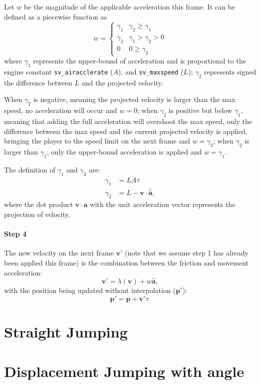 \documentclass[a4paper,12pt]{article}
\newcommand{\tvec}[1]{\boldsymbol{#1}}
\newcommand{\tunit}[1]{\boldsymbol{\hat{#1}}}
\newcommand{\ta}{\tvec{a}}
\newcommand{\tv}{\tvec{v}}
\newcommand{\tp}{\tvec{p}}
\begin{document}
Let $w$ be the magnitude of the applicable acceleration this frame. It can be defined as a piecewise function as
\[
    w = \begin{cases}
        \gamma_1 & \gamma_2 \ge \gamma_1\\
        \gamma_2 & \gamma_1 > \gamma_2 > 0\\
        0 & 0 \ge \gamma_2
    \end{cases}
\]
where $\gamma_1$ represents the upper-bound of acceleration and is proportional to the engine constant \verb|sv_airacclerate| ($A$), and \verb|sv_maxspeed| ($L$); $\gamma_2$ represents signed the difference between $L$ and the projected velocity.

When $\gamma_2$ is negative, meaning the projected velocity is larger than the max speed, no acceleration will occur and $w=0$; when $\gamma_2$ is positive but below $\gamma_1$, meaning that adding the full acceleration will overshoot the max speed, only the difference between the max speed and the current projected velocity is applied, bringing the player to the speed limit on the next frame and $w=\gamma_2$; when $\gamma_2$ is larger than $\gamma_1$, only the upper-bound acceleration is applied and $w=\gamma_1$.

The definition of $\gamma_1$ and $\gamma_2$ are:
\begin{align*}
    \gamma_1 &= LA\tau\\
    \gamma_2 &= L - \tv \cdot \tunit{\ta},
\end{align*}
where the dot product $\tv \cdot \tunit{\ta}$ with the unit acceleration vector represents the projection of velocity.

\paragraph{Step 4} The new velocity on the next frame $\tv'$ (note that we assume step 1 has already been applied this frame) is the combination between the friction and movement acceleration:
\[
    \tv' = \lambda(\tv) + w \tunit{\ta},
\]
with the position being updated without interpolation ($\tp'$):
\[
    \tp' = \tp + \tv' \tau.
\]



\section{Straight Jumping}


\section{Displacement Jumping with angle}








\nocite{*}
\newpage
\printbibliography
\end{document}
